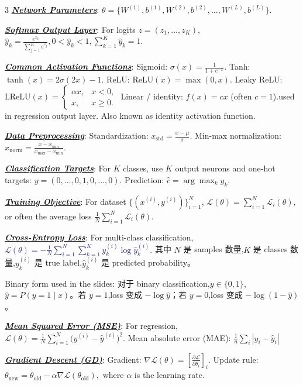 \documentclass[12pt]{article}
\newcommand{\bulletPoint}[1]{\underline{\textit{\textbf{#1}}}}
\begin{document}
\begin{multicols*}{3}
\bulletPoint{Network Parameters}:
$\theta=\{W^{(1)},b^{(1)},W^{(2)},b^{(2)},\dots,W^{(L)},b^{(L)}\}.$

\bulletPoint{Softmax Output Layer}:
For logits $z=(z_1,\dots,z_K)$,
\textcolor{purple!60!black}{$\textstyle
\hat y_k=\frac{e^{z_k}}{\sum_{j=1}^K e^{z_j}},
0<\hat y_k<1,
\sum_{k=1}^K \hat y_k=1.
$}

\bulletPoint{Common Activation Functions}:
Sigmoid:
$\sigma(x)=\frac{1}{1+e^{-x}}.$
Tanh:
$\tanh(x)=2\sigma(2x)-1.$
ReLU:
$\mathrm{ReLU}(x)=\max(0,x).$
Leaky ReLU:
$\mathrm{LReLU}(x)=\begin{cases}\alpha x,&x<0,\\x,&x\ge 0.\end{cases}$
Linear / identity:
$f(x)=cx$ (often $c=1$).used in regression output layer. 
Also known as identity activation function.

\bulletPoint{Data Preprocessing}:
Standardization:
$x_{\mathrm{std}}=\frac{x-\mu}{\sigma}.$
Min-max normalization:
$x_{\mathrm{norm}}=\frac{x-x_{\min}}{x_{\max}-x_{\min}}.$

\bulletPoint{Classification Targets}:
For $K$ classes, use $K$ output neurons and one-hot targets:
$y=(0,\dots,0,1,0,\dots,0).$
Prediction:
$\hat c=\arg\max_k \hat y_k.$

\bulletPoint{Training Objective}:
For dataset $\{(x^{(i)},y^{(i)})\}_{i=1}^N$,
$\mathcal L(\theta)=\sum_{i=1}^N \mathcal L_i(\theta),$
or often the average loss
$\frac{1}{N}\sum_{i=1}^N \mathcal L_i(\theta).$

\bulletPoint{Cross-Entropy Loss}:
For multi-class classification,
\textcolor{MidnightBlue}{\boldmath $\textstyle
\mathcal L(\theta)
=
-\frac{1}{N}\sum_{i=1}^N \sum_{k=1}^K
y_k^{(i)}\log \hat y_k^{(i)}.
$}
其中 $N$ 是 samples 数量,$K$ 是 classes 数量,$y_k^{(i)}$ 是 true label,$\hat y_k^{(i)}$ 是 predicted probability。

Binary form used in the slides:
对于 binary classification,$y\in\{0,1\}$,$\hat y=P(y=1\mid x)$。若 $y=1$,loss 变成 $-\log \hat y$；若 $y=0$,loss 变成 $-\log(1-\hat y)$。

\bulletPoint{Mean Squared Error (MSE)}:
For regression,
$\mathcal L(\theta)=\frac{1}{N}\sum_{i=1}^N \bigl(y^{(i)}-\hat y^{(i)}\bigr)^2.$
Mean absolute error (MAE): $\frac{1}{n} \sum_i |y_i - \hat{y}_i|$

\bulletPoint{Gradient Descent (GD)}:
Gradient:
$\nabla \mathcal L(\theta)=\left[\frac{\partial \mathcal L}{\partial \theta_i}\right]_i.$
Update rule:
\textcolor{blue!50!black}{$\textstyle
\theta_{\mathrm{new}}
=
\theta_{\mathrm{old}}
-\alpha \nabla \mathcal L(\theta_{\mathrm{old}}),
$}
where $\alpha$ is the learning rate.


\end{multicols*}
\end{document}
